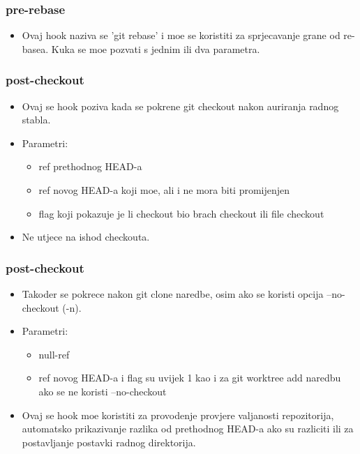 \documentclass{beamer}
\begin{document}
\begin{frame}
\frametitle{pre-rebase}
\begin{itemize}
    \item Ovaj hook naziva se 'git rebase' i moe se koristiti za sprjecavanje grane od re-basea. Kuka se moe pozvati s jednim ili dva parametra.
\end{itemize}
\end{frame}

\begin{frame}
\frametitle{post-checkout}
\begin{itemize}
    \item Ovaj se hook poziva kada se pokrene git checkout nakon auriranja radnog stabla.
    \item Parametri:
    \begin{itemize}
	    \item ref prethodnog HEAD-a
	    \item ref novog HEAD-a koji moe, ali i ne mora biti promijenjen
	    \item flag koji pokazuje je li checkout bio brach checkout ili file checkout
	\end{itemize}
    \item Ne utjece na ishod checkouta.
\end{itemize}
\end{frame}
\begin{frame}
\frametitle{post-checkout}
\begin{itemize}
    \item Takoder se pokrece nakon git clone naredbe, osim ako se koristi opcija --no-checkout (-n).
    \item Parametri:
    \begin{itemize}
        \item null-ref
        \item ref novog HEAD-a i flag su uvijek 1 kao i za git worktree add naredbu ako se ne koristi --no-checkout
    \end{itemize}
    \item Ovaj se hook moe koristiti za provodenje provjere valjanosti repozitorija, automatsko prikazivanje razlika od prethodnog HEAD-a ako su razliciti ili za postavljanje postavki radnog direktorija.
\end{itemize}
\end{frame}
	
\end{document}
